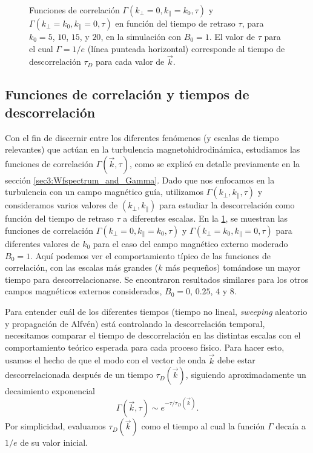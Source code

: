 \begin{figure}
  \centering

  \caption{Funciones de correlación
    $\Gamma(k_\perp=0,k_\parallel=k_0,\tau)$ y
    $\Gamma(k_\perp=k_0,k_\parallel=0,\tau)$ en función del tiempo de
    retraso $\tau$, para $k_0=5$, $10$, $15$, y $20$, en la simulación con
    $B_0=1$. El valor de $\tau$ para el cual $\Gamma=1/e$ (línea punteada
    horizontal) corresponde al tiempo de descorrelación $\tau_D$ para
    cada valor de $\vec{k}$.}
  \label{fig3-4:B1_bvf_b_kperp/kpara0}
\end{figure}


\subsection{Funciones de correlación y tiempos de descorrelación}

Con el fin de discernir entre los diferentes fenómenos (y escalas de
tiempo relevantes) que actúan en la turbulencia magnetohidrodinámica,
estudiamos las funciones de correlación $\Gamma(\vec{k},\tau)$, como
se explicó en detalle previamente en la sección
\ref{sec3:Wfspectrum_and_Gamma}. Dado que nos enfocamos en la
turbulencia con un campo magnético guía, utilizamos $\Gamma(k_\perp,
k_\parallel, \tau)$ y consideramos varios valores de $(k_\perp,
k_\parallel)$ para estudiar la descorrelación como función del tiempo
de retraso $\tau$ a diferentes escalas.  En la
\cref{fig3-4:B1_bvf_b_kperp/kpara0}, se muestran las funciones de
correlación $\Gamma(k_\perp=0,k_\parallel=k_0,\tau)$ y
$\Gamma(k_\perp=k_0,k_\parallel=0,\tau)$ para diferentes valores de
$k_0$ para el caso del campo magnético externo moderado $B_0=1$. Aquí
podemos ver el comportamiento típico de las funciones de correlación,
con las escalas más grandes ($k$ más pequeños) tomándose un mayor
tiempo para descorrelacionarse. Se encontraron resultados similares
para los otros campos magnéticos externos considerados, $B_0=0$,
$0.25$, $4$ y $8$.

Para entender cuál de los diferentes tiempos (tiempo no lineal,
\textit{sweeping} aleatorio y propagación de Alfvén) está controlando la
descorrelación temporal, necesitamos comparar el tiempo de
descorrelación en las distintas escalas con el comportamiento teórico
esperada para cada proceso físico. Para hacer esto, usamos el hecho de
que el modo con el vector de onda $\vec{k}$ debe estar
descorrelacionada después de un tiempo $\tau_D(\vec{k})$, siguiendo
aproximadamente un decaimiento exponencial
\begin{equation}
\Gamma(\vec{k},\tau) \sim e^{-\tau/\tau_D(\vec{k})}.
\end{equation}
Por simplicidad, evaluamos $\tau_D(\vec{k})$ como el tiempo al cual la
función $\Gamma$ decaía a $1/e$ de su valor inicial.

